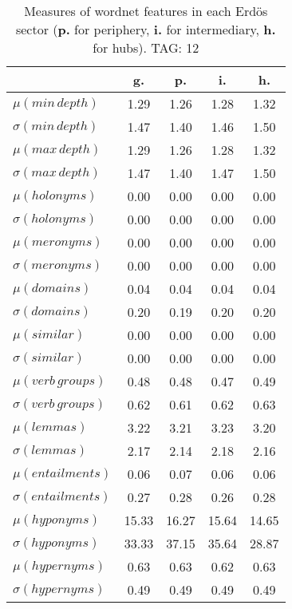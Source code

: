 \begin{table}[h!]
\begin{center}
\begin{tabular}{| l || c | c | c | c |}\hline
 & {\bf g.} & {\bf p.} & {\bf i.} & {\bf h.} \\\hline\hline
$\mu(min\,depth)$ & 1.29  & 1.26  & 1.28  & 1.32 \\
$\sigma(min\,depth)$ & 1.47  & 1.40  & 1.46  & 1.50 \\\hline
$\mu(max\,depth)$ & 1.29  & 1.26  & 1.28  & 1.32 \\
$\sigma(max\,depth)$ & 1.47  & 1.40  & 1.47  & 1.50 \\\hline
$\mu(holonyms)$ & 0.00  & 0.00  & 0.00  & 0.00 \\
$\sigma(holonyms)$ & 0.00  & 0.00  & 0.00  & 0.00 \\\hline
$\mu(meronyms)$ & 0.00  & 0.00  & 0.00  & 0.00 \\
$\sigma(meronyms)$ & 0.00  & 0.00  & 0.00  & 0.00 \\\hline
$\mu(domains)$ & 0.04  & 0.04  & 0.04  & 0.04 \\
$\sigma(domains)$ & 0.20  & 0.19  & 0.20  & 0.20 \\\hline
$\mu(similar)$ & 0.00  & 0.00  & 0.00  & 0.00 \\
$\sigma(similar)$ & 0.00  & 0.00  & 0.00  & 0.00 \\\hline
$\mu(verb\,groups)$ & 0.48  & 0.48  & 0.47  & 0.49 \\
$\sigma(verb\,groups)$ & 0.62  & 0.61  & 0.62  & 0.63 \\\hline
$\mu(lemmas)$ & 3.22  & 3.21  & 3.23  & 3.20 \\
$\sigma(lemmas)$ & 2.17  & 2.14  & 2.18  & 2.16 \\\hline
$\mu(entailments)$ & 0.06  & 0.07  & 0.06  & 0.06 \\
$\sigma(entailments)$ & 0.27  & 0.28  & 0.26  & 0.28 \\\hline
$\mu(hyponyms)$ & 15.33  & 16.27  & 15.64  & 14.65 \\
$\sigma(hyponyms)$ & 33.33  & 37.15  & 35.64  & 28.87 \\\hline
$\mu(hypernyms)$ & 0.63  & 0.63  & 0.62  & 0.63 \\
$\sigma(hypernyms)$ & 0.49  & 0.49  & 0.49  & 0.49 \\\hline
\end{tabular}
\caption{Measures of wordnet features in each Erd\"os sector ({{\bf p.}} for periphery, {{\bf i.}} for intermediary, {{\bf h.}} for hubs). TAG: 12}
\end{center}
\end{table}